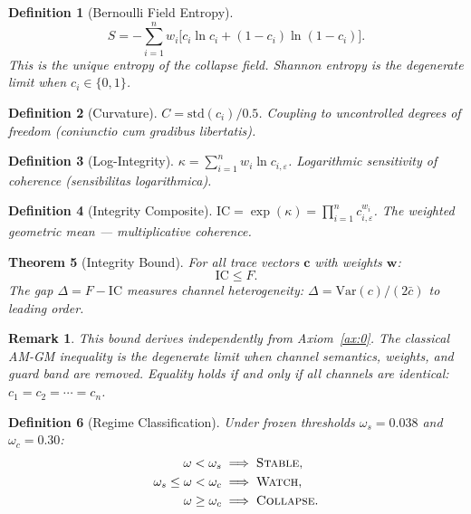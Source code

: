 \documentclass[
  aps,
  prd,
  preprint,
  superscriptaddress,
  nofootinbib,
  floatfix,
  longbibliography
]{revtex4-2}
\newtheorem{theorem}{Theorem}
\newtheorem{definition}[theorem]{Definition}
\newtheorem{remark}{Remark}
\newcommand{\eps}{\varepsilon}
\newcommand{\beq}{\begin{equation}}
\newcommand{\eeq}{\end{equation}}
\newcommand{\regime}[1]{\textrm{\upshape\scshape#1}}
\newcommand{\tvec}{\mathbf{c}}
\newcommand{\wvec}{\mathbf{w}}
\newcommand{\IC}{\mathrm{IC}}
\newcommand{\Fid}{F}
\newcommand{\Drft}{\omega}
\newcommand{\Ent}{S}
\newcommand{\Curv}{C}
\newcommand{\Logint}{\kappa}
\newcommand{\hetgap}{\Delta}
\newcommand{\lat}[1]{\textit{#1}}
\begin{document}
\begin{definition}[Bernoulli Field Entropy]\label{def:S}
\beq
  \Ent = -\sum_{i=1}^{n} w_i
    \bigl[c_i \ln c_i + (1 - c_i)\ln(1-c_i)\bigr].
\eeq
This is the unique entropy of the collapse field.
Shannon entropy is the degenerate limit when $c_i \in \{0,1\}$.
\end{definition}

\begin{definition}[Curvature]\label{def:C}
$\Curv = \mathrm{std}(c_i) / 0.5$. \quad
Coupling to uncontrolled degrees of freedom
(\lat{coniunctio cum gradibus libertatis}).
\end{definition}

\begin{definition}[Log-Integrity]\label{def:kappa}
$\Logint = \sum_{i=1}^{n} w_i \ln c_{i,\eps}$. \quad
Logarithmic sensitivity of coherence
(\lat{sensibilitas logarithmica}).
\end{definition}

\begin{definition}[Integrity Composite]\label{def:IC}
$\IC = \exp(\Logint) = \prod_{i=1}^{n} c_{i,\eps}^{w_i}$. \quad
The weighted geometric mean — multiplicative coherence.
\end{definition}

\begin{theorem}[Integrity Bound]\label{thm:ICbound}
For all trace vectors $\tvec$ with weights $\wvec$:
\beq
  \IC \leq \Fid.
\eeq
The gap $\hetgap = \Fid - \IC$ measures channel
heterogeneity: $\hetgap = \mathrm{Var}(c) / (2\bar{c})$
to leading order.
\end{theorem}

\begin{remark}
This bound derives independently from Axiom~\ref{ax:0}.
The classical AM-GM inequality is the degenerate limit
when channel semantics, weights, and guard band are removed.
Equality holds if and only if all channels are identical:
$c_1 = c_2 = \cdots = c_n$.
\end{remark}

\begin{definition}[Regime Classification]\label{def:regime}
Under frozen thresholds
$\Drft_s = 0.038$ and $\Drft_c = 0.30$:
\begin{align}
  \Drft < \Drft_s &\implies \regime{Stable}, \nonumber\\
  \Drft_s \leq \Drft < \Drft_c &\implies \regime{Watch}, \nonumber\\
  \Drft \geq \Drft_c &\implies \regime{Collapse}.
\end{align}
\end{definition}
\end{document}
